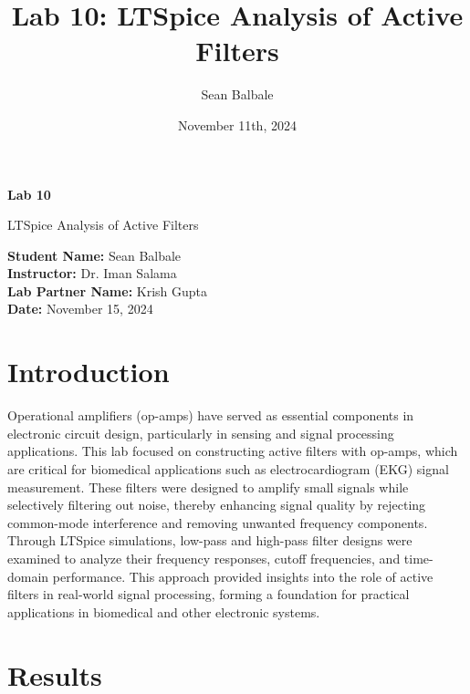 \documentclass[12pt]{article}
\title{Lab 10: LTSpice Analysis of Active Filters}
\author{Sean Balbale}
\date{November 11th, 2024}
\begin{document}
\begin{titlepage}
	\begin{center}
		\vspace*{1in}

		\Huge
		\textbf{Lab 10}

		\LARGE
		LTSpice Analysis of Active Filters

		\vspace{3 in}

		\textbf{Student Name:} Sean Balbale
		\\ \textbf{Instructor:} Dr. Iman Salama
		\\ \textbf{Lab Partner Name:} Krish Gupta
		\\ \textbf{Date:} November 15, 2024

		\vfill


	\end{center}
\end{titlepage}

\newpage

\section{Introduction}
Operational amplifiers (op-amps) have served as essential components in
electronic circuit design, particularly in sensing and signal processing
applications. This lab focused on constructing active filters with op-amps,
which are critical for biomedical applications such as electrocardiogram (EKG)
signal measurement. These filters were designed to amplify small signals while
selectively filtering out noise, thereby enhancing signal quality by rejecting
common-mode interference and removing unwanted frequency components. Through
LTSpice simulations, low-pass and high-pass filter designs were examined to
analyze their frequency responses, cutoff frequencies, and time-domain
performance. This approach provided insights into the role of active filters in
real-world signal processing, forming a foundation for practical applications in
biomedical and other electronic systems.



\section{Results}
\end{document}

